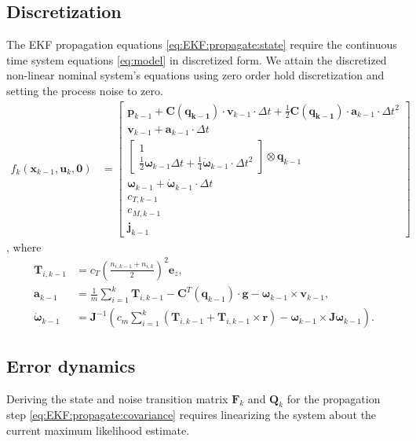 \documentclass[10pt,a4paper]{article}
\begin{document}
\subsection*{Discretization}
The EKF propagation equations \ref{eq:EKF:propagate:state} require the continuous time system equations \ref{eq:model} in discretized form. We attain the discretized non-linear nominal system's equations using zero order hold discretization and setting the process noise to zero.
\begin{align}
f_k(\mathbf{x}_{k-1},\mathbf{u}_k, \mathbf{0}) &= \begin{bmatrix}
\mathbf{p}_{k-1} + \mathbf{C}(\mathbf{q_{k-1}}) \cdot \mathbf{v}_{k-1} \cdot \Delta t + \frac{1}{2} \mathbf{C}(\mathbf{q_{k-1}}) \cdot \mathbf{a}_{k-1} \cdot \Delta t ^2 \\
\mathbf{v}_{k-1} + \mathbf{a}_{k-1} \cdot \Delta t \\
\begin{bmatrix}
1 \\ \frac{1}{2} \boldsymbol{\omega}_{k-1} \Delta t + \frac{1}{4} \dot{\boldsymbol{\omega}}_{k-1} \cdot \Delta t ^2
\end{bmatrix} \otimes \mathbf{q}_{k-1} \\
\boldsymbol{\omega}_{k-1} + \dot{\boldsymbol{\omega}}_{k-1} \cdot \Delta t \\
c_{T,k-1} \\
c_{M,k-1} \\
\mathbf{j}_{k-1}
\end{bmatrix}
\end{align}
, where
\begin{align}
\mathbf{T}_{i,k-1} &= c_T \left( \frac{n_{i,k-1} + n_{i,k}}{2} \right) ^2 \mathbf{e}_z, \\
\mathbf{a}_{k-1} &= \frac{1}{m} \sum_{i=1}^k \mathbf{T}_{i,k-1}  - \mathbf{C}^T(\mathbf{q}_{k-1}) \cdot \mathbf{g} - \boldsymbol{\omega}_{k-1} \times \mathbf{v}_{k-1},  \\
\dot{\boldsymbol{\omega}}_{k-1} &= \mathbf{J}^{-1} \left( c_m \sum_{i=1}^k \left( \mathbf{T}_{i,k-1} + \mathbf{T}_{i,k-1} \times \mathbf{r} \right) - \boldsymbol{\omega}_{k-1} \times \mathbf{J} \boldsymbol{\omega}_{k-1} \right).
\end{align}

\subsection*{Error dynamics}
Deriving the state and noise transition matrix $\mathbf{F}_k$ and $\mathbf{Q}_k$ for the propagation step \ref{eq:EKF:propagate:covariance} requires linearizing the system about the current maximum likelihood estimate.
\printbibliography
\end{document}
